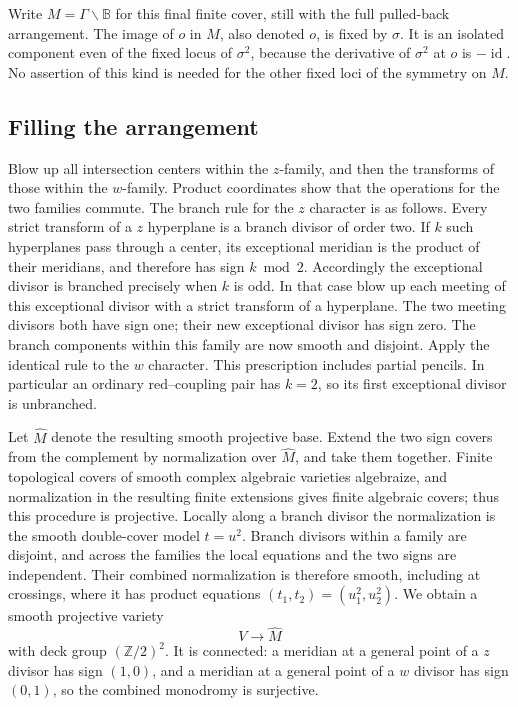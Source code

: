 \documentclass[11pt,reqno]{amsart}
\numberwithin{equation}{section}
\theoremstyle{definition}
\theoremstyle{remark}
\newcommand{\Z}{\mathbb Z}
\newcommand{\BB}{\mathbb B}
\DeclareMathOperator{\id}{id}
\begin{document}
Write $M=\Gamma\backslash\BB$ for this final finite cover, still with
the full pulled-back arrangement.  The image of $o$ in $M$, also denoted
$o$, is fixed by $\sigma$.  It is an isolated component even of the
fixed locus of $\sigma^2$, because the derivative of $\sigma^2$ at $o$
is $-\id$.  No assertion of this kind is needed for the other fixed
loci of the symmetry on $M$.

\subsection{Filling the arrangement}\label{geo:fill}

Blow up all intersection centers within the $z$-family, and then the
transforms of those within the $w$-family.  Product coordinates show
that the operations for the two families commute.  The branch rule
for the $z$ character is as follows.  Every strict transform of a
$z$ hyperplane is a branch divisor of order two.  If $k$ such
hyperplanes pass through a center, its exceptional meridian is the
product of their meridians, and therefore has sign $k\bmod2$.
Accordingly the exceptional divisor is branched precisely when $k$
is odd.  In that case blow up each meeting of this exceptional divisor
with a strict transform of a hyperplane.  The two meeting divisors
both have sign one; their new exceptional divisor has sign zero.
The branch components within this family are now smooth and disjoint.
Apply the identical rule to the $w$ character.  This prescription
includes partial pencils.  In particular an ordinary red--coupling
pair has $k=2$, so its first exceptional divisor is unbranched.

Let $\widehat M$ denote the resulting smooth projective base.  Extend
the two sign covers from the complement by normalization over
$\widehat M$, and take them together.  Finite topological covers of
smooth complex algebraic varieties algebraize, and normalization in
the resulting finite extensions gives finite algebraic covers; thus
this procedure is projective.  Locally along a branch divisor the
normalization is the smooth double-cover model $t=u^2$.  Branch
divisors within a family are disjoint, and across the families the
local equations and the two signs are independent.  Their combined
normalization is therefore smooth, including at crossings, where it
has product equations $(t_1,t_2)=(u_1^2,u_2^2)$.  We obtain a smooth
projective variety
\begin{equation}\label{geo:V}
                 V\longrightarrow\widehat M
\end{equation}
with deck group $(\Z/2)^2$.  It is connected: a meridian at a general
point of a $z$ divisor has sign $(1,0)$, and a meridian at a general
point of a $w$ divisor has sign $(0,1)$, so the combined monodromy is
surjective.
\end{document}
